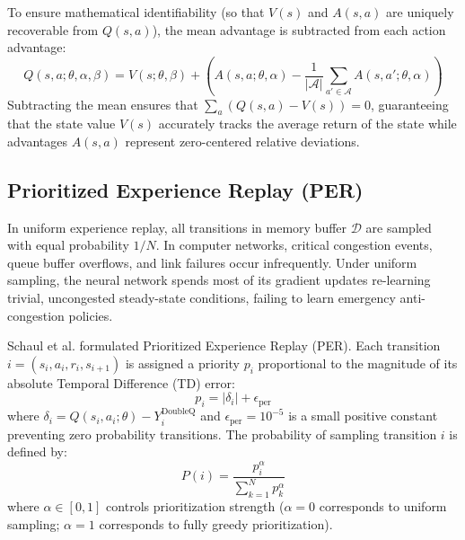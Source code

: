 To ensure mathematical identifiability (so that $V(s)$ and $A(s, a)$ are uniquely recoverable from $Q(s, a)$), the mean advantage is subtracted from each action advantage:
\begin{equation}
    Q(s, a; \theta, \alpha, \beta) = V(s; \theta, \beta) + \left( A(s, a; \theta, \alpha) - \frac{1}{|\mathcal{A}|} \sum_{a' \in \mathcal{A}} A(s, a'; \theta, \alpha) \right)
    \label{eq:dueling_identifiability}
\end{equation}
Subtracting the mean ensures that $\sum_a (Q(s, a) - V(s)) = 0$, guaranteeing that the state value $V(s)$ accurately tracks the average return of the state while advantages $A(s, a)$ represent zero-centered relative deviations.

\subsection{Prioritized Experience Replay (PER)}
In uniform experience replay, all transitions in memory buffer $\mathcal{D}$ are sampled with equal probability $1/N$. In computer networks, critical congestion events, queue buffer overflows, and link failures occur infrequently. Under uniform sampling, the neural network spends most of its gradient updates re-learning trivial, uncongested steady-state conditions, failing to learn emergency anti-congestion policies.

Schaul et al. \cite{schaul2016prioritized} formulated Prioritized Experience Replay (PER). Each transition $i = (s_i, a_i, r_i, s_{i+1})$ is assigned a priority $p_i$ proportional to the magnitude of its absolute Temporal Difference (TD) error:
\begin{equation}
    p_i = |\delta_i| + \epsilon_{\text{per}}
    \label{eq:per_priority}
\end{equation}
where $\delta_i = Q(s_i, a_i; \theta) - Y_i^{\text{DoubleQ}}$ and $\epsilon_{\text{per}} = 10^{-5}$ is a small positive constant preventing zero probability transitions. The probability of sampling transition $i$ is defined by:
\begin{equation}
    P(i) = \frac{p_i^\alpha}{\sum_{k=1}^N p_k^\alpha}
    \label{eq:per_sampling_prob}
\end{equation}
where $\alpha \in [0, 1]$ controls prioritization strength ($\alpha = 0$ corresponds to uniform sampling; $\alpha = 1$ corresponds to fully greedy prioritization).

